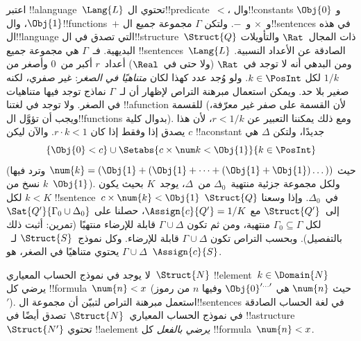 \documentclass[../../../include/open-logic-section]{subfiles}
\begin{document}
{\begin{ex}
اعتبر !!a{language}~$\Lang{L}$ تحتوي ال!!{predicate}~$<$، وال!!{constant}s
$\Obj{0}$ و $\Obj{1}$، وال!!{function}s~$+$ و~$\times$ و~$-$.
ولتكن $\Gamma$ مجموعة جميع ال!!{sentence}s في هذه ال!!{language} التي
تصدق في ال!!{structure}~$\Struct{Q}$ ذات المجال~$\Rat$ والتأويلات
البديهية. فـ~$\Gamma$ هي مجموعة جميع !!{sentence}s~$\Lang{L}$ الصادقة
عن الأعداد النسبية. ومن البدهي أنه لا توجد في~$\Rat$ (ولا حتى
في~$\Real$) أعداد~$r$ أكبر من~$0$ وأصغر من $1/k$ لكل
$k \in \PosInt$. ولو وُجد عدد كهذا لكان \emph{متناهيًا في الصغر}: غير
صفري، لكنه صغير بلا حد. ويمكن استعمال مبرهنة التراص لإظهار أن
لـ~$\Gamma$ نماذج توجد فيها متناهيات في الصغر. ولا توجد في لغتنا
!!a{function} للقسمة (لأن القسمة على صفر غير معرّفة، ويجب أن تؤوَّل
ال!!{function}s بدوال كلية). ومع ذلك يمكننا التعبير عن $r < 1/k$، لأن
هذا يصدق إذا وفقط إذا كان $r \cdot k < 1$. والآن ليكن $c$ !!a{constant}
جديدًا، ولتكن $\Delta$ هي
\[
\{\Obj{0} < c\}
\cup \Setabs{ c \times \num k < \Obj{1} }{k \in \PosInt}
\]
(حيث $\num{k} = (\Obj{1} + (\Obj{1} + \dots + (\Obj{1} +
\Obj{1})\dots))$ وترد فيها $k$ نسخ من~$\Obj{1}$). ولكل مجموعة جزئية
منتهية~$\Delta_0$ من~$\Delta$، يوجد~$K$ بحيث يكون $k < K$ لكل
!!{sentence}~$c \times \num{k} < \Obj{1}$ في~$\Delta_0$. وإذا وسعنا
$\Struct{Q}$ إلى~$\Struct{Q'}$ مع $\Assign{c}{Q'} = 1/K$، حصلنا على
$\Sat{Q'}{\Gamma_0 \cup \Delta_0}$ لكل $\Gamma_0 \subseteq \Gamma$
منتهية، ومن ثم تكون $\Gamma \cup \Delta$ قابلة للإرضاء منتهيًا
(تمرين: أثبت ذلك بالتفصيل). وبحسب التراص تكون $\Gamma \cup \Delta$
قابلة للإرضاء. وكل نموذج~$\Struct{S}$ لـ~$\Gamma \cup \Delta$ يحتوي
متناهيًا في الصغر، هو~$\Assign{c}{S}$.
\end{ex}
}{}

\begin{prob}
لا يوجد في نموذج الحساب المعياري~$\Struct{N}$ !!{element}~$k \in
\Domain{N}$ يرضي كل !!{formula}~$\num{n} < x$ (حيث
$\num{n}$ هي $\Obj{0}^{\prime\dots\prime}$ وفيها $n$ من رموز
$\prime$). استعمل مبرهنة التراص لتبيّن أن مجموعة ال!!{sentence}s في لغة
الحساب الصادقة في نموذج الحساب المعياري~$\Struct{N}$ تصدق أيضًا في
!!a{structure}~$\Struct{N'}$ تحتوي !!a{element} \emph{يرضي بالفعل} كل
!!{formula}~$\num{n} < x$.
\end{prob}
\tagendprob
\end{document}
